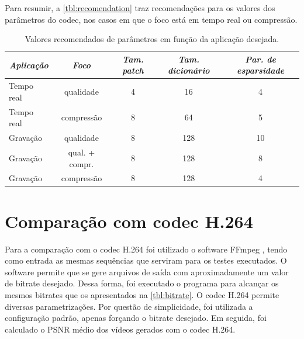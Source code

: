 \documentclass[cic,tc]{iiufrgs}
\begin{document}
Para resumir, a \autoref{tbl:recomendation} traz recomendações para os valores dos parâmetros do codec, 
nos casos em que o foco está em tempo real ou compressão.

\begin{table}[h]
    \caption{Valores recomendados de parâmetros em função da aplicação desejada.}
    \centering
    \begin{tabular}{|l|c|c|c|c|}
        \hline
        \multicolumn{1}{|c|}{\emph{Aplicação}} & 
        \emph{Foco} & 
        \emph{Tam. patch} & 
        \emph{Tam. dicionário} & 
        \emph{Par. de esparsidade} \\
        \hline
        Tempo real & qualidade & 4 & 16 & 4 \\
        Tempo real & compressão & 8 & 64 & 5 \\
        Gravação & qualidade & 8 & 128 & 10 \\
        Gravação & qual. + compr. & 8 & 128 & 8 \\
        Gravação & compressão & 8 & 128 & 4 \\
        \hline
    \end{tabular}
    \label{tbl:recomendation}
\end{table}

\section{Comparação com codec H.264}
Para a comparação com o codec H.264 foi utilizado o software FFmpeg \cite{FFmpeg}, tendo como entrada
as mesmas sequências que serviram para os testes executados. 
O software permite que se gere arquivos de saída com aproximadamente um valor de bitrate desejado.
Dessa forma, foi executado o programa para alcançar os mesmos bitrates que os apresentados 
na \autoref{tbl:bitrate}.
O codec H.264 permite diversas parametrizações.
Por questão de simplicidade, foi utilizada a configuração padrão, apenas forçando o bitrate desejado.
Em seguida, foi calculado o PSNR médio dos vídeos gerados com o codec H.264.
\end{document}
